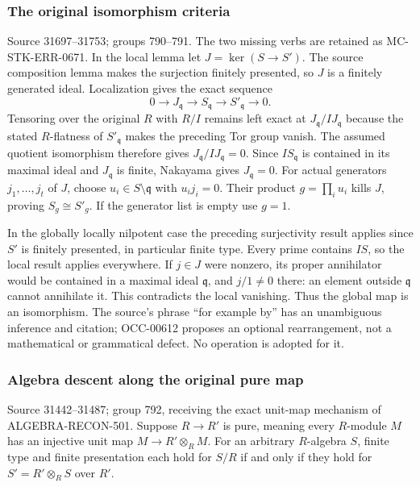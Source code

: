 \subsubsection{The original isomorphism criteria}\label{the-original-isomorphism-criteria}

Source 31697--31753; groups 790--791. The two missing verbs are retained as MC-STK-ERR-0671. In the local lemma let \(J=\ker(S\to S')\). The source composition lemma makes the surjection finitely presented, so \(J\) is a finitely generated ideal. Localization gives the exact sequence \[
0\to J_{\mathfrak q}\to S_{\mathfrak q}\to S'_{\mathfrak q}\to0.
\] Tensoring over the original \(R\) with \(R/I\) remains left exact at \(J_{\mathfrak q}/IJ_{\mathfrak q}\) because the stated \(R\)-flatness of \(S'_{\mathfrak q}\) makes the preceding Tor group vanish. The assumed quotient isomorphism therefore gives \(J_{\mathfrak q}/IJ_{\mathfrak q}=0\). Since \(IS_{\mathfrak q}\) is contained in its maximal ideal and \(J_{\mathfrak q}\) is finite, Nakayama gives \(J_{\mathfrak q}=0\). For actual generators \(j_1,\ldots,j_t\) of \(J\), choose \(u_i\in S\setminus\mathfrak q\) with \(u_i j_i=0\). Their product \(g=\prod_i u_i\) kills \(J\), proving \(S_g\cong S'_g\). If the generator list is empty use \(g=1\).

In the globally locally nilpotent case the preceding surjectivity result applies since \(S'\) is finitely presented, in particular finite type. Every prime contains \(IS\), so the local result applies everywhere. If \(j\in J\) were nonzero, its proper annihilator would be contained in a maximal ideal \(\mathfrak q\), and \(j/1\ne0\) there: an element outside \(\mathfrak q\) cannot annihilate it. This contradicts the local vanishing. Thus the global map is an isomorphism. The source's phrase ``for example by'' has an unambiguous inference and citation; OCC-00612 proposes an optional rearrangement, not a mathematical or grammatical defect. No operation is adopted for it.

\subsubsection{Algebra descent along the original pure map}\label{algebra-descent-along-the-original-pure-map}

Source 31442--31487; group 792, receiving the exact unit-map mechanism of ALGEBRA-RECON-501. Suppose \(R\to R'\) is pure, meaning every \(R\)-module \(M\) has an injective unit map \(M\to R'\otimes_R M\). For an arbitrary \(R\)-algebra \(S\), finite type and finite presentation each hold for \(S/R\) if and only if they hold for \(S'=R'\otimes_R S\) over \(R'\).

